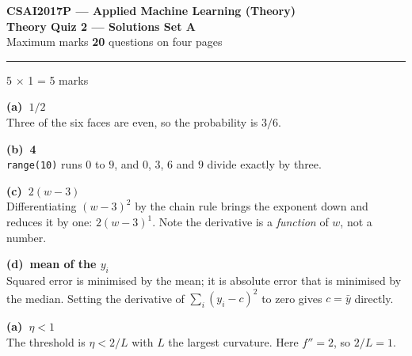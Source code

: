\documentclass[10pt,a4paper]{article}
\newcommand{\SetLetter}{}
\newcommand{\parthead}[2]{\vspace{2pt}\noindent\rule{\linewidth}{0.4pt}\par\vspace{2pt}%
  \noindent{\bfseries Part #1}\hfill{\small #2}\par\vspace{1pt}}
\newcommand{\sol}[1]{\textbf{#1}}
\begin{document}
\renewcommand{\SetLetter}{A}\setcounter{page}{1}

\begin{center}
{\large\bfseries CSAI2017P --- Applied Machine Learning (Theory)}\\[2pt]
{\large\bfseries Theory Quiz 2 --- Solutions \quad\textbullet\quad Set A}\\[3pt]
{\small Maximum marks \textbf{20} \quad\textbullet{} questions on four pages}
\end{center}
\vspace{2pt}

\noindent{}
\vspace{3pt}


\parthead{A --- Multiple choice}{5 $\times$ 1 = 5 marks}

\begin{sA}

  \item \sol{(a)\ $1/2$}\\ Three of the six faces are even, so the probability is $3/6$.

  \item \sol{(b)\ 4}\\ \texttt{range(10)} runs $0$ to $9$, and $0$, $3$, $6$ and $9$ divide exactly by three.

  \item \sol{(c)\ $2(w-3)$}\\ Differentiating $(w-3)^2$ by the chain rule brings the exponent down and reduces it by one: $2(w-3)^1$. Note the derivative is a \emph{function} of $w$, not a number.

  \item \sol{(d)\ mean of the $y_i$}\\ Squared error is minimised by the mean; it is absolute error that is minimised by the median. Setting the derivative of $\sum_i (y_i - c)^2$ to zero gives $c = \bar y$ directly.

  \item \sol{(a)\ $\eta < 1$}\\ The threshold is $\eta < 2/L$ with $L$ the largest curvature. Here $f'' = 2$, so $2/L = 1$.

\end{sA}
\end{document}
